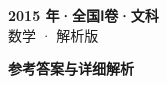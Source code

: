 \documentclass[zihao=-4, a4paper]{ctexart}
\begin{document}
\begin{center}
  {\Large\bfseries 2015 年·全国Ⅰ卷·文科}\\[4pt]
  {\large 数学 · 解析版}
\end{center}
\medskip
{}

\clearpage
{}
\begin{center}{\Large\bfseries 参考答案与详细解析}\end{center}
\medskip

\end{document}

